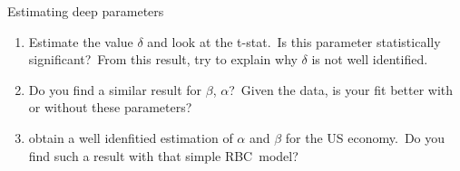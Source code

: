 \documentclass[a4paper,12pt]{article}%
\begin{document}
\begin{myexercise}{Estimating deep parameters}
\begin{enumerate}
\item Estimate the value $\delta$ and look at the t-stat.\ Is this parameter
statistically significant?\ From this result, try to explain why $\delta$ is
not well identified.

\item Do you find a similar result for $\beta$, $\alpha$?\ Given the data, is
your fit better with or without these parameters?

\item \cite{smets2007shocks} obtain a well idenfitied estimation of $\alpha$
and $\beta$ for the US economy.\ Do you find such a result with that simple RBC\ model?
\end{enumerate}

%

\end{myexercise}%
%

\footnotesize

%
\normalsize
\end{document}

